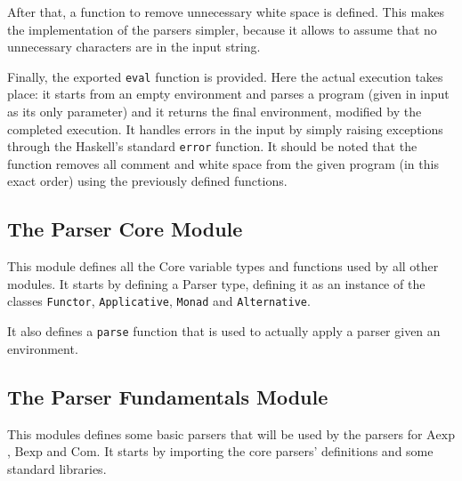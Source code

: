 \documentclass{esposito-documentation}
\begin{document}


After that, a function to remove unnecessary white space is defined. This makes
the implementation of the parsers simpler, because it allows to assume that no
unnecessary characters are in the input string.



Finally, the exported \lstinline|eval| function is provided. Here the actual
execution takes place: it starts from an empty environment and parses a program
(given in input as its only parameter) and it returns the final environment,
modified by the completed execution. It handles errors in the input by simply
raising exceptions through the Haskell's standard \lstinline|error| function.
It should be noted that the function removes all comment and white space from
the given program (in this exact order) using the previously defined functions.



\subsection{The Parser Core Module}


This module defines all the Core variable types and functions used by all other
modules. It starts by defining a Parser type, defining it as an instance of the
classes \lstinline|Functor|, \lstinline|Applicative|, \lstinline|Monad| and
\lstinline|Alternative|.







It also defines a \lstinline|parse| function that is used to actually apply a
parser given an environment.


\subsection{The Parser Fundamentals Module}


This modules defines some basic parsers that will be used by the parsers for
$\mathrm{Aexp}$, $\mathrm{Bexp}$ and $\mathrm{Com}$. It starts by importing the
core parsers' definitions and some standard libraries.
\end{document}
